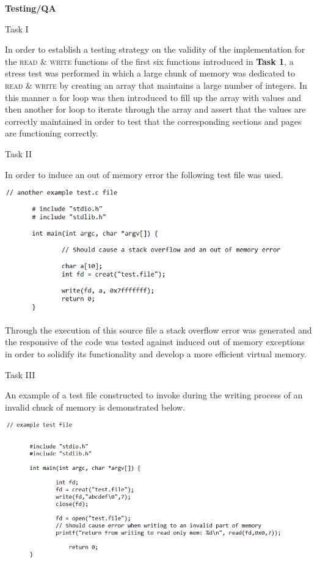 \documentclass[12pt]{article}
\begin{document}
{\setlength{\parindent}{0cm}
\textbf{Testing/QA}\\
\begin{center}Task I\end{center}
In order to establish a testing strategy on the validity of the implementation for the \textsc{read} $\&$ \textsc{write} functions of the first six functions introduced in \textbf{Task 1}, a stress test was performed in which a large chunk of memory was dedicated to \textsc{read} $\&$ \textsc{write} by creating an array that maintains a large number of integers.
In this manner a for loop was then introduced to fill up the array with values and then another for loop to iterate through the array and assert that the values are correctly maintained in order to test that the corresponding sections and pages are functioning correctly.
\begin{center}Task II\end{center}
In order to induce an out of memory error the following test file was used.
\begin{center}\includegraphics[width=120mm]{test2.png}\end{center}
Through the execution of this source file a stack overflow error was generated and the responsive of the code was tested against induced out of memory exceptions in order 
  to solidify its functionality and develop a more efficient virtual memory.      
\begin{center}Task III\end{center}
An example of a test file constructed to invoke during the writing process of an invalid chuck of memory is demonstrated below.
\begin{center}\includegraphics[width=120mm]{test1.png}\end{center}
}
\end{document}
